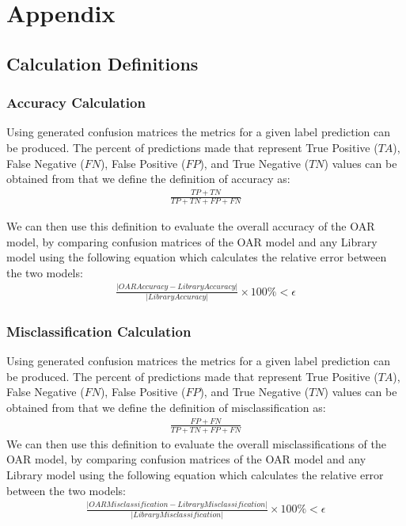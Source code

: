 \documentclass[12pt, titlepage]{article}
\begin{document}




\newpage

\section{Appendix}

\subsection{Calculation Definitions}

\subsubsection{Accuracy Calculation} \label{accuracy_calc}

Using generated confusion matrices the metrics for a given label prediction can be produced. The percent of predictions made
that represent True Positive ($\mathit{TA}$), False Negative ($\mathit{FN}$), False Positive ($\mathit{FP}$), and True Negative ($\mathit{TN}$) values can be obtained 
from that we define the definition of accuracy as:
\begin{gather}
\frac{\mathit{TP} + \mathit{TN}}{\mathit{TP} + \mathit{TN} + \mathit{FP} + \mathit{FN}}
\end{gather}

We can then use this definition to evaluate the overall accuracy of the OAR model, by comparing confusion matrices of the OAR model 
and any Library model using the following equation which calculates the relative error between the two models:
\begin{gather}
\frac{|\mathit{OAR Accuracy} - \mathit{Library Accuracy}|}{|\mathit{Library Accuracy}|} \times 100\% < \epsilon
\end{gather}
\subsubsection{Misclassification Calculation} \label{misclass_calc}

Using generated confusion matrices the metrics for a given label prediction can be produced. The percent of predictions made
that represent True Positive ($\mathit{TA}$), False Negative ($\mathit{FN}$), False Positive ($\mathit{FP}$), and True Negative ($\mathit{TN}$) values can be obtained 
from that we define the definition of misclassification as:
\begin{gather}
\frac{\mathit{FP} + \mathit{FN}}{\mathit{TP} + \mathit{TN} + \mathit{FP} + \mathit{FN}}
\end{gather}
We can then use this definition to evaluate the overall misclassifications of the OAR model, by comparing confusion matrices of the OAR model 
and any Library model using the following equation which calculates the relative error between the two models:
\begin{gather}
\frac{|\mathit{OAR Misclassification} - \mathit{Library Misclassification}|}{|\mathit{Library Misclassification}|} \times 100\% < \epsilon
\end{gather}
\end{document}
